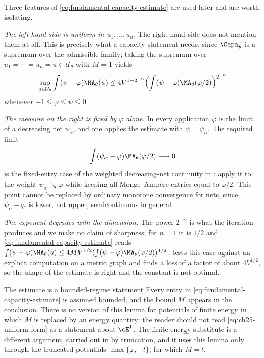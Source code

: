 \begin{remark}
\label{rem:ch25-reading-fundamental}
Three features of \eqref{eq:fundamental-capacity-estimate} are used later and
are worth isolating.

\emph{The left-hand side is uniform in $u_1,\ldots,u_n$.}  The right-hand
side does not mention them at all.  This is precisely what a capacity
statement needs, since $\Capa_\theta$ is a supremum over the admissible
family; taking the supremum over $u_1=\cdots=u_n=u\in\mathcal U_\theta$
with $M=1$ yields
\begin{equation}
\label{eq:ch25-uniform-form}
 \sup_{u\in\mathcal U_\theta}\int(\psi-\varphi)\MA_\theta(u)
 \leq4V^{1-2^{-n}}
 \Bigl(\int(\psi-\varphi)\MA_\theta(\varphi/2)\Bigr)^{2^{-n}}
\end{equation}
whenever $-1\leq\varphi\leq\psi\leq0$.

\emph{The measure on the right is fixed by $\varphi$ alone.}  In every
application $\varphi$ is the limit of a decreasing net $\psi_\alpha$, and
one applies the estimate with $\psi=\psi_\alpha$.  The required limit
\[
 \int(\psi_\alpha-\varphi)\MA_\theta(\varphi/2)\longrightarrow0
\]
is the fixed-entry case of the weighted decreasing-net continuity in
: apply it to the weight
$\psi_\alpha\searrow\varphi$ while keeping all Monge--Amp\`ere entries equal
to $\varphi/2$.  This point cannot be replaced by ordinary monotone
convergence for nets, since $\psi_\alpha-\varphi$ is lower, not upper,
semicontinuous in general.

\emph{The exponent degrades with the dimension.}  The power $2^{-n}$ is
what the iteration produces and we make no claim of sharpness; for
$n=1$ it is $1/2$ and \eqref{eq:fundamental-capacity-estimate} reads
$\int(\psi-\varphi)\MA_\theta(u)\leq4MV^{1/2}
(\int(\psi-\varphi)\MA_\theta(\varphi/2))^{1/2}$.
 tests this case against an explicit
computation on a metric graph and finds a loss of a factor of about
$4V^{1/2}$, so the shape of the estimate is right and the constant is not
optimal.
\end{remark}

\begin{warning}{The estimate is a bounded-regime statement}
Every entry in \eqref{eq:fundamental-capacity-estimate} is assumed bounded,
and the bound $M$ appears in the conclusion.  There is no version of this
lemma for potentials of finite energy in which $M$ is replaced by an energy
quantity: the reader should not read \eqref{eq:ch25-uniform-form} as a
statement about $\cE^1$.  The finite-energy substitute is a different
argument, carried out in
 by truncation, and it
uses this lemma only through the truncated potentials
$\max\{\varphi,-t\}$, for which $M=t$.
\end{warning}

